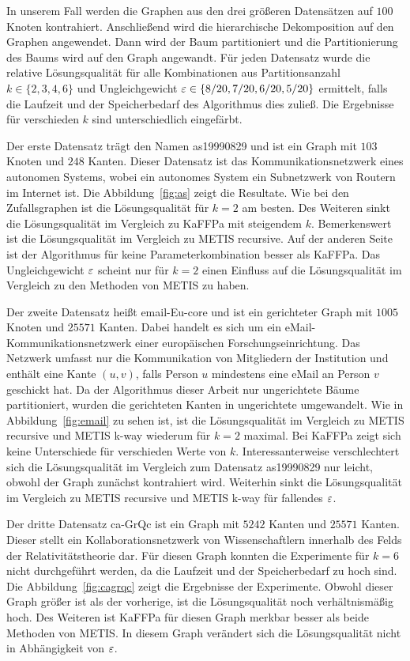 In unserem Fall werden die Graphen aus den drei größeren Datensätzen auf $100$ Knoten kontrahiert.
Anschließend wird die hierarchische Dekomposition auf den Graphen angewendet.
Dann wird der Baum partitioniert und die Partitionierung des Baums wird auf den Graph angewandt.
Für jeden Datensatz wurde die relative Lösungsqualität für alle Kombinationen aus Partitionsanzahl $k \in \{2,3,4,6\}$ und Ungleichgewicht $\varepsilon \in \{8/20, 7/20, 6/20, 5/20\}$ ermittelt, falls die Laufzeit und der Speicherbedarf des Algorithmus dies zuließ.
Die Ergebnisse für verschieden $k$ sind unterschiedlich eingefärbt.

Der erste Datensatz trägt den Namen as19990829 und ist ein Graph mit $103$ Knoten und $248$ Kanten.
Dieser Datensatz ist das Kommunikationsnetzwerk eines autonomen Systems, wobei ein autonomes System ein Subnetzwerk von Routern im Internet ist.
Die Abbildung~\ref{fig:as} zeigt die Resultate.
Wie bei den Zufallsgraphen ist die Lösungsqualität für $k=2$ am besten.
Des Weiteren sinkt die Lösungsqualität im Vergleich zu KaFFPa mit steigendem $k$.
Bemerkenswert ist die Lösungsqualität im Vergleich zu METIS recursive.
Auf der anderen Seite ist der Algorithmus für keine Parameterkombination besser als KaFFPa.
Das Ungleichgewicht $\varepsilon$ scheint nur für $k=2$ einen Einfluss auf die Lösungsqualität im Vergleich zu den Methoden von METIS zu haben.

Der zweite Datensatz heißt email-Eu-core und ist ein gerichteter Graph mit $1005$ Knoten und $25571$ Kanten.
Dabei handelt es sich um ein eMail\hyp Kommunikationsnetzwerk einer europäischen Forschungseinrichtung.
Das Netzwerk umfasst nur die Kommunikation von Mitgliedern der Institution und enthält eine Kante $(u, v)$, falls Person $u$ mindestens eine eMail an Person $v$ geschickt hat.
Da der Algorithmus dieser Arbeit nur ungerichtete Bäume partitioniert, wurden die gerichteten Kanten in ungerichtete umgewandelt.
Wie in Abbildung~\ref{fig:email} zu sehen ist, ist die Lösungsqualität im Vergleich zu METIS recursive und METIS k-way wiederum für $k=2$ maximal.
Bei KaFFPa zeigt sich keine Unterschiede für verschieden Werte von $k$.
Interessanterweise verschlechtert sich die Lösungsqualität im Vergleich zum Datensatz as19990829 nur leicht, obwohl der Graph zunächst kontrahiert wird.
Weiterhin sinkt die Lösungsqualität im Vergleich zu METIS recursive und METIS k-way für fallendes $\varepsilon$.

Der dritte Datensatz ca-GrQc ist ein Graph mit $5242$ Kanten und $25571$ Kanten.
Dieser stellt ein Kollaborationsnetzwerk von Wissenschaftlern innerhalb des Felds der Relativitätstheorie dar.
Für diesen Graph konnten die Experimente für $k=6$ nicht durchgeführt werden, da die Laufzeit und der Speicherbedarf zu hoch sind. 
Die Abbildung~\ref{fig:cagrqc} zeigt die Ergebnisse der Experimente.
Obwohl dieser Graph größer ist als der vorherige, ist die Lösungsqualität noch verhältnismäßig hoch.
Des Weiteren ist KaFFPa für diesen Graph merkbar besser als beide Methoden von METIS.
In diesem Graph verändert sich die Lösungsqualität nicht in Abhängigkeit von $\varepsilon$.


